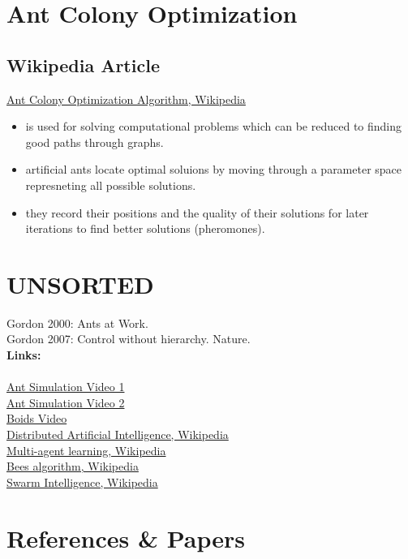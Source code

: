 \section{Ant Colony Optimization}
\subsection{Wikipedia Article}
\href{https://en.wikipedia.org/wiki/Ant_colony_optimization_algorithms}{Ant Colony Optimization Algorithm, Wikipedia}
\begin{itemize}[noitemsep,nolistsep]
	\item is used for solving computational problems which can be reduced to finding good paths through graphs.
	\item artificial ants locate optimal soluions by moving through a parameter space represneting all possible solutions.
	\item they record their positions and the quality of their solutions for later iterations to find better solutions (pheromones).
\end{itemize}

\section{UNSORTED}
Gordon 2000: Ants at Work.
\\
Gordon 2007: Control without hierarchy. Nature.
\\\textbf{Links:}\\
\\
\href{https://www.youtube.com/watch?v=X-iSQQgOd1A}{Ant Simulation Video 1}
\\
\href{https://www.youtube.com/watch?v=81GQNPJip2Y}{Ant Simulation Video 2}
\\
\href{https://www.youtube.com/watch?v=bqtqltqcQhw}{Boids Video}
\\
\href{https://en.wikipedia.org/wiki/Distributed_artificial_intelligence}{Distributed Artificial Intelligence, Wikipedia}
\\
\href{https://en.wikipedia.org/wiki/Multi-agent_learning}{Multi-agent learning, Wikipedia}
\\
\href{https://en.wikipedia.org/wiki/Bees_algorithm}{Bees algorithm, Wikipedia}
\\
\href{https://en.wikipedia.org/wiki/Swarm_intelligence}{Swarm Intelligence, Wikipedia}

\section{References \& Papers}
